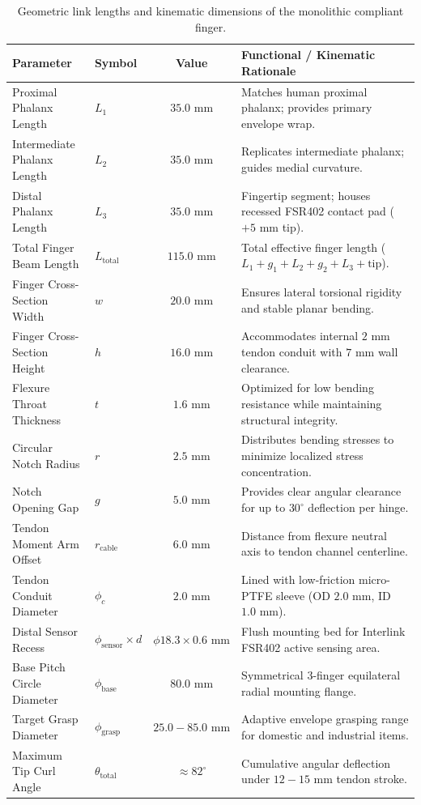 \documentclass[12pt,a4paper]{report}
\begin{document}
\begin{table}[htbp]
\centering
\small
\caption{Geometric link lengths and kinematic dimensions of the monolithic compliant finger.}
\label{tab:link_dimensions}
\begin{tabularx}{\textwidth}{l p{3.2cm} c X}
\toprule
\textbf{Parameter} & \textbf{Symbol} & \textbf{Value} & \textbf{Functional / Kinematic Rationale} \\
\midrule
Proximal Phalanx Length & $L_1$ & $35.0\text{ mm}$ & Matches human proximal phalanx; provides primary envelope wrap. \\
Intermediate Phalanx Length & $L_2$ & $35.0\text{ mm}$ & Replicates intermediate phalanx; guides medial curvature. \\
Distal Phalanx Length & $L_3$ & $35.0\text{ mm}$ & Fingertip segment; houses recessed FSR402 contact pad ($+5\text{ mm}$ tip). \\
Total Finger Beam Length & $L_{\text{total}}$ & $115.0\text{ mm}$ & Total effective finger length ($L_1 + g_1 + L_2 + g_2 + L_3 + \text{tip}$). \\
Finger Cross-Section Width & $w$ & $20.0\text{ mm}$ & Ensures lateral torsional rigidity and stable planar bending. \\
Finger Cross-Section Height & $h$ & $16.0\text{ mm}$ & Accommodates internal $2\text{ mm}$ tendon conduit with $7\text{ mm}$ wall clearance. \\
Flexure Throat Thickness & $t$ & $1.6\text{ mm}$ & Optimized for low bending resistance while maintaining structural integrity. \\
Circular Notch Radius & $r$ & $2.5\text{ mm}$ & Distributes bending stresses to minimize localized stress concentration. \\
Notch Opening Gap & $g$ & $5.0\text{ mm}$ & Provides clear angular clearance for up to $30^\circ$ deflection per hinge. \\
Tendon Moment Arm Offset & $r_{\text{cable}}$ & $6.0\text{ mm}$ & Distance from flexure neutral axis to tendon channel centerline. \\
Tendon Conduit Diameter & $\phi_c$ & $2.0\text{ mm}$ & Lined with low-friction micro-PTFE sleeve (OD $2.0\text{ mm}$, ID $1.0\text{ mm}$). \\
Distal Sensor Recess & $\phi_{\text{sensor}} \times d$ & $\phi 18.3 \times 0.6\text{ mm}$ & Flush mounting bed for Interlink FSR402 active sensing area. \\
Base Pitch Circle Diameter & $\phi_{\text{base}}$ & $80.0\text{ mm}$ & Symmetrical 3-finger equilateral radial mounting flange. \\
Target Grasp Diameter & $\phi_{\text{grasp}}$ & $25.0 - 85.0\text{ mm}$ & Adaptive envelope grasping range for domestic and industrial items. \\
Maximum Tip Curl Angle & $\theta_{\text{total}}$ & $\approx 82^\circ$ & Cumulative angular deflection under $12 - 15\text{ mm}$ tendon stroke. \\
\bottomrule
\end{tabularx}
\end{table}
\end{document}
